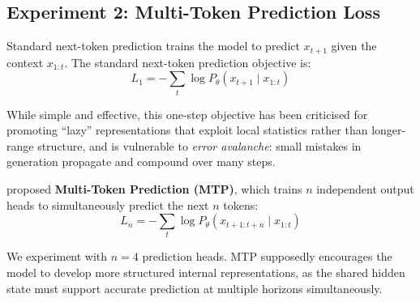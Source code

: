           



\subsection{Experiment 2: Multi-Token Prediction Loss}

Standard next-token prediction trains the model to predict $x_{t+1}$ given the context
$x_{1:t}$. The standard next-token prediction objective is:
\begin{equation*}
    L_1 = -\sum_t \log P_\theta(x_{t+1} \mid x_{1:t})
\end{equation*}

While simple and effective, this one-step objective has been criticised for promoting
``lazy'' representations that exploit local statistics rather than longer-range structure, and is vulnerable to \emph{error avalanche}: small mistakes in generation propagate and compound over many steps.

\textcite{gloeckle2024better} proposed \textbf{Multi-Token Prediction (MTP)}, which trains
$n$ independent output heads to simultaneously predict the next $n$ tokens:
\begin{equation*}
    L_n = -\sum_t \log P_\theta(x_{t+1:t+n} \mid x_{1:t})
\end{equation*}

We experiment with $n=4$ prediction heads. MTP supposedly encourages the model to develop more structured internal representations, as the shared hidden state must support accurate prediction at multiple horizons simultaneously.

